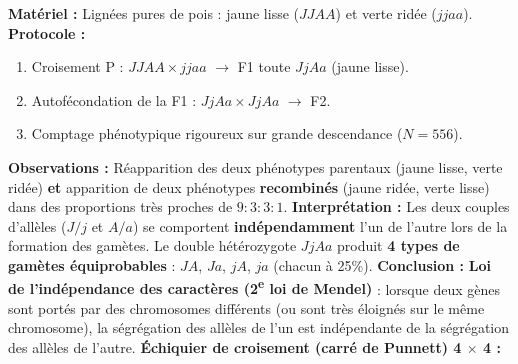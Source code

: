 \documentclass[11pt]{article}
\begin{document}
\begin{experience}
\textbf{Matériel :} Lignées pures de pois : jaune lisse ($JJAA$) et verte ridée ($jjaa$).
\textbf{Protocole :}
\begin{enumerate}
    \item Croisement P : $JJAA \times jjaa$ $\rightarrow$ F1 toute $JjAa$ (jaune lisse).
    \item Autofécondation de la F1 : $JjAa \times JjAa$ $\rightarrow$ F2.
    \item Comptage phénotypique rigoureux sur grande descendance ($N = 556$).
\end{enumerate}
\textbf{Observations :} Réapparition des deux phénotypes parentaux (jaune lisse, verte ridée) \textbf{et} apparition de deux phénotypes \textbf{recombinés} (jaune ridée, verte lisse) dans des proportions très proches de $9 : 3 : 3 : 1$.
\textbf{Interprétation :} Les deux couples d'allèles ($J/j$ et $A/a$) se comportent \textbf{indépendamment} l'un de l'autre lors de la formation des gamètes. Le double hétérozygote $JjAa$ produit \textbf{4 types de gamètes équiprobables} : $JA$, $Ja$, $jA$, $ja$ (chacun à 25\%).
\textbf{Conclusion :} \textbf{Loi de l'indépendance des caractères (2\textsuperscript{e} loi de Mendel)} : lorsque deux gènes sont portés par des chromosomes différents (ou sont très éloignés sur le même chromosome), la ségrégation des allèles de l'un est indépendante de la ségrégation des allèles de l'autre.
\tcblower
\textbf{Échiquier de croisement (carré de Punnett) 4 $\times$ 4 :}
\end{experience}
\end{document}
